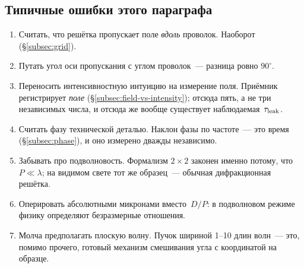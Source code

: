 \subsection{Типичные ошибки этого параграфа}

\begin{enumerate}[leftmargin=1.6em,itemsep=0.25em]
  \item Считать, что решётка пропускает поле \emph{вдоль} проволок. Наоборот
        (§\ref{subsec:grid}).
  \item Путать угол оси пропускания с углом проволок~--- разница ровно $90^\circ$.
  \item Переносить интенсивностную интуицию на измерение поля. Приёмник регистрирует
        \emph{поле} (§\ref{subsec:field-vs-intensity}); отсюда пять, а не три независимых числа,
        и отсюда же вообще существует наблюдаемая~$\tau_{\mathrm{leak}}$.
  \item Считать фазу технической деталью. Наклон фазы по частоте~--- это время
        (§\ref{subsec:phase}), и оно измерено дважды независимо.
  \item Забывать про подволновость. Формализм $2\times2$ законен именно потому, что
        $P\ll\lambda$; на видимом свете тот же образец~--- обычная дифракционная решётка.
  \item Оперировать абсолютными микронами вместо~$D/P$: в подволновом режиме физику определяют
        безразмерные отношения.
  \item Молча предполагать плоскую волну. Пучок шириной 1--10 длин волн~--- это, помимо
        прочего, готовый механизм смешивания угла с координатой на образце.
\end{enumerate}

\clearpage
